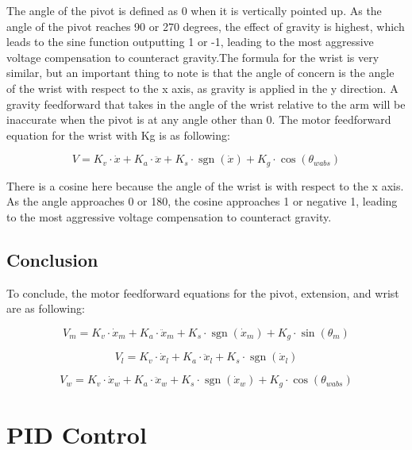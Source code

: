\documentclass{scrartcl}
\DeclareMathOperator{\sgn}{sgn}
\begin{document}
The angle of the pivot is defined as 0 when it is vertically pointed up. As the angle of the pivot reaches 90 or 270 degrees, the effect of gravity is highest, which leads to the sine function outputting 1 or -1, leading to the most aggressive voltage compensation to counteract gravity.The formula for the wrist is very similar, but an important thing to note is that the angle of concern is the angle of the wrist with respect to the x axis, as gravity is applied in the y direction. A gravity feedforward that takes in the angle of the wrist relative to the arm will be inaccurate when the pivot is at any angle other than 0. The motor feedforward equation for the wrist with Kg is as following:

\begin{equation} \label{Motor Feedforward Equation with Gravity Wrist}
    V = K_v \cdot \dot{x} + K_a \cdot \ddot{x} + K_s \cdot \sgn(\dot{x}) + K_g \cdot \cos(\theta_{wabs})
\end{equation}

There is a cosine here because the angle of the wrist is with respect to the x axis. As the angle approaches 0 or 180, the cosine approaches 1 or negative 1, leading to the most aggressive voltage compensation to counteract gravity.
\subsection{Conclusion}
To conclude, the motor feedforward equations for the pivot, extension, and wrist are as following:

\begin{equation} \label{Motor Feedforward Equation Pivot}
    V_{m} = K_v \cdot \dot{x}_{m} + K_a \cdot \ddot{x}_{m} + K_s \cdot \sgn(\dot{x}_{m}) + K_g \cdot \sin(\theta_{m})
\end{equation}

\begin{equation} \label{Motor Feedforward Equation Extension}
    V_{l} = K_v \cdot \dot{x}_{l} + K_a \cdot \ddot{x}_{l} + K_s \cdot \sgn(\dot{x}_{l})
\end{equation}

\begin{equation} \label{Motor Feedforward Equation Wrist}
    V_{w} = K_v \cdot \dot{x}_{w} + K_a \cdot \ddot{x}_{w} + K_s \cdot \sgn(\dot{x}_{w}) + K_g \cdot \cos(\theta_{wabs})
\end{equation}

\section{PID Control}
\end{document}
